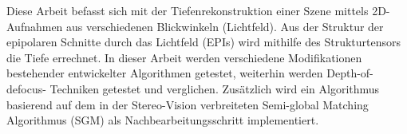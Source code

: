 
Diese Arbeit befasst sich mit der Tiefenrekonstruktion einer Szene mittels 2D-Aufnahmen aus verschiedenen Blickwinkeln (Lichtfeld). Aus der Struktur der epipolaren Schnitte durch das Lichtfeld (EPIs) wird mithilfe des Strukturtensors die Tiefe errechnet. In dieser Arbeit werden verschiedene Modifikationen bestehender entwickelter Algorithmen getestet, weiterhin werden Depth-of-defocus- Techniken getestet und verglichen. Zusätzlich wird ein Algorithmus basierend auf dem in der Stereo-Vision verbreiteten Semi-global Matching Algorithmus (SGM) als Nachbearbeitungsschritt implementiert.